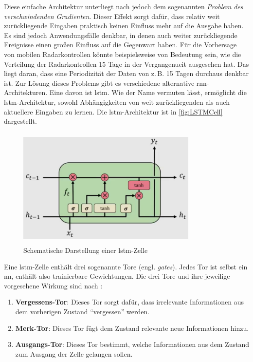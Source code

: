 Diese einfache Architektur unterliegt nach \cite[S. 260]{DeepLearningPythonKeras} jedoch dem sogenannten \emph{Problem des verschwindenden Gradienten}.
Dieser Effekt sorgt dafür, dass relativ weit zurückliegende Eingaben praktisch keinen Einfluss mehr auf die Ausgabe haben.
Es sind jedoch Anwendungsfälle denkbar, in denen auch weiter zurückliegende Ereignisse einen großen Einfluss auf die Gegenwart haben.
Für die Vorhersage von mobilen Radarkontrollen könnte beispielsweise von Bedeutung sein, wie die Verteilung der Radarkontrollen 15 Tage in der Vergangenueit ausgesehen hat.
Das liegt daran, dass eine Periodizität der Daten von z.\,B. 15 Tagen durchaus denkbar ist.
Zur Lösung dieses Problems gibt es verschiedene alternative \acrshort{rnn}-Architekturen.
Eine davon ist \acrfull{lstm}.
Wie der Name vermuten lässt, ermöglicht die \acrshort{lstm}-Architektur, sowohl Abhängigkeiten von weit zurückliegenden als auch aktuellere Eingaben zu lernen.
Die \acrshort{lstm}-Architektur ist in \autoref{fig:LSTMCell} dargestellt.

\begin{figure}[h]
    \centering
    \includegraphics[width=0.8\textwidth,height=6cm,keepaspectratio=true]{content/images/LSTMCell.png}
    \caption{Schematische Darstellung einer \acrshort{lstm}-Zelle \cite{6S191RNN}}
    \label{fig:LSTMCell}
\end{figure}

Eine \acrshort{lstm}-Zelle enthält drei sogenannte Tore (engl. \emph{gates}).
Jedes Tor ist selbst ein \acrshort{nn}, enthält also trainierbare Gewichtungen.
Die drei Tore und ihre jeweilige vorgesehene Wirkung sind nach \cite{6S191RNN}:

\begin{minipage}{\linewidth}
\begin{enumerate}
    \setlength\itemsep{0.2em}
    \item \textbf{Vergessens-Tor}: Dieses Tor sorgt dafür, dass irrelevante Informationen aus dem vorherigen Zustand "`vergessen"' werden.
    \item \textbf{Merk-Tor}: Dieses Tor fügt dem Zustand relevante neue Informationen hinzu.
    \item \textbf{Ausgangs-Tor}: Dieses Tor bestimmt, welche Informationen aus dem Zustand zum Ausgang der Zelle gelangen sollen.
\end{enumerate}
\end{minipage}


